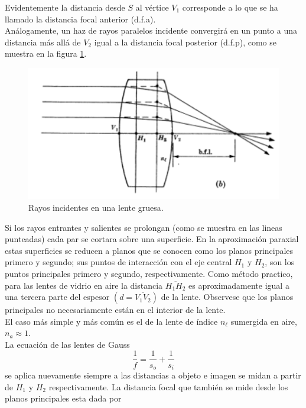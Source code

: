 \documentclass[13,twocolumn,letterpaper]{article}
\begin{document}
{	
	Evidentemente la distancia desde $S$ al v\'ertice $V_{1}$ corresponde a lo que se ha llamado la distancia focal anterior (d.f.a).\\ An\'alogamente, un haz de rayos paralelos incidente convergir\'a en un punto a una distancia m\'as all\'a de $V_{2}$ igual a la distancia focal posterior (d.f.p), como se muestra en la figura \ref{fig:fig2}.
	\begin{figure}[h!]
		\centering
		\includegraphics[width=0.9\linewidth]{fig2}
		\caption{\footnotesize{Rayos incidentes en una lente gruesa.}}
		\label{fig:fig2}
	\end{figure}
	Si los rayos entrantes y salientes se prolongan (como se muestra en las lineas punteadas) cada par se cortara sobre una superficie. En la aproximaci\'on paraxial estas superficies se reducen a planos que se conocen como los planos principales primero y segundo; sus puntos de interacci\'on con el eje central $H_{1}$ y $H_{2}$, son los puntos principales primero y segundo, respectivamente. Como m\'etodo practico, para las lentes de vidrio en aire la distancia $\overline{H_{1}H_{2}}$ es aproximadamente igual a una tercera parte del espesor $(d=\overline{V_{1}V_{2}})$ de la lente. Observese que los planos principales no necesariamente están en el interior de la lente. \\
	El caso m\'as simple y m\'as com\'un   es el de la lente de \'indice $n_{\ell}$ sumergida en aire,\\ $n_{a}\approx1$. \\
	La ecuaci\'on de las lentes de Gauss
	\begin{equation}\label{ec1}
		\dfrac{1}{f}=\dfrac{1}{s_{o}}+\dfrac{1}{s_{i}}
	\end{equation}
	se aplica nuevamente siempre a las distancias a objeto e imagen se midan a partir de $H_{1}$ y $H_{2}$ respectivamente. La distancia focal que tambi\'en se mide desde los planos principales esta dada por
	\begin{equation}\label{ec2}

\end{equation}}
\end{document}
